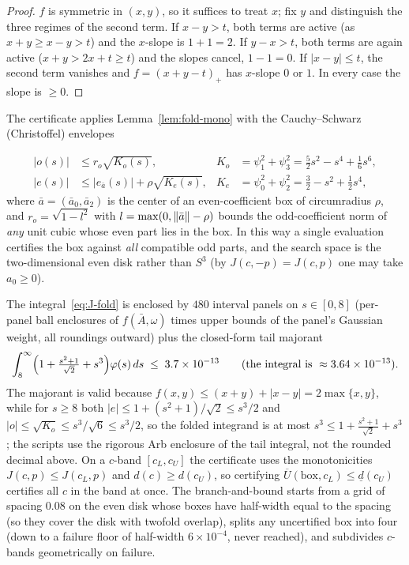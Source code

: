 \begin{proof}
$f$ is symmetric in $(x,y)$, so it suffices to treat $x$; fix $y$ and distinguish the three regimes of the second term. If $x-y>t$, both terms are active (as $x+y\ge x-y>t$) and the $x$-slope is $1+1=2$. If $y-x>t$, both terms are again active ($x+y>2x+t\ge t$) and the slopes cancel, $1-1=0$. If $|x-y|\le t$, the second term vanishes and $f=(x+y-t)_+$ has $x$-slope $0$ or $1$. In every case the slope is $\ge0$.
\end{proof}

The certificate applies Lemma~\ref{lem:fold-mono} with the Cauchy--Schwarz (Christoffel) envelopes

\begin{align*}
        |o(s)|&\le r_o\sqrt{K_o(s)},
        & K_o&=\psi_1^2+\psi_3^2=\tfrac{5}{2}s^2-s^4+\tfrac16 s^6,\\
        |e(s)|&\le|e_{\bar a}(s)|+\rho\sqrt{K_e(s)},
        & K_e&=\psi_0^2+\psi_2^2=\tfrac32-s^2+\tfrac12 s^4,
\end{align*}
where $\bar a=(\bar a_0,\bar a_2)$ is the center of an even-coefficient box of circumradius $\rho$, and $r_o=\sqrt{1-l^2}$ with $l=\max(0,\lVert\bar a\rVert-\rho)$ bounds the odd-coefficient norm of \emph{any} unit cubic whose even part lies in the box. In this way a single evaluation certifies the box against \emph{all} compatible odd parts, and the search space is the two-dimensional even disk rather than $S^3$ (by $J(c,-p)=J(c,p)$ one may take $a_0\ge0$).

The integral~\eqref{eq:J-fold} is enclosed by $480$ interval panels on $s\in[0,8]$ (per-panel ball enclosures of $f(\bar A,\omega)$ times upper bounds of the panel's Gaussian weight, all roundings outward) plus the closed-form tail majorant
\[
        \int_8^\infty\Bigl(1+\tfrac{s^2+1}{\sqrt2}+s^3\Bigr)\varphi(s)\,ds\;\le\;3.7\times10^{-13}
        \qquad(\text{the integral is }\approx3.64\times10^{-13}).
\]
The majorant is valid because $f(x,y)\le(x+y)+|x-y|=2\max\{x,y\}$, while for $s\ge8$ both $|e|\le1+(s^2+1)/\sqrt2\le s^3/2$ and $|o|\le\sqrt{K_o}\le s^3/\sqrt6\le s^3/2$, so the folded integrand is at most $s^3\le1+\tfrac{s^2+1}{\sqrt2}+s^3$; the scripts use the rigorous Arb enclosure of the tail integral, not the rounded decimal above. On a $c$-band $[c_L,c_U]$ the certificate uses the monotonicities $J(c,p)\le J(c_L,p)$ and $d(c)\ge d(c_U)$, so certifying $\overline{U}(\text{box},c_L)\le\underline{d}(c_U)$ certifies all $c$ in the band at once. The branch-and-bound starts from a grid of spacing $0.08$ on the even disk whose boxes have half-width equal to the spacing (so they cover the disk with twofold overlap), splits any uncertified box into four (down to a failure floor of half-width $6\times10^{-4}$, never reached), and subdivides $c$-bands geometrically on failure.

